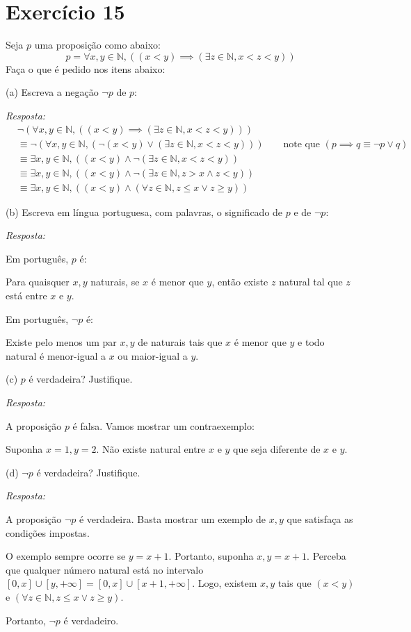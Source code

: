 \documentclass{article}
\begin{document}
\section*{Exercício 15}

Seja $p$ uma proposição como abaixo:
\[ p = \forall x,y \in \mathbb{N}, ((x<y) \implies (\exists z \in \mathbb{N}, x<z<y)) \]
Faça o que é pedido nos itens abaixo:

(a) Escreva a negação $\neg p$ de $p$:

\textit{Resposta: }
\begin{align*}
&\neg(\forall x,y \in \mathbb{N}, ((x<y) \implies (\exists z \in \mathbb{N}, x<z<y)))\\
&\equiv \neg(\forall x,y \in \mathbb{N}, (\neg(x<y) \lor (\exists z \in \mathbb{N}, x<z<y))) \qquad \mbox{note que }(p \implies q \equiv \neg p \lor q) \\
&\equiv \exists x,y \in \mathbb{N}, ((x<y) \land \neg (\exists z \in \mathbb{N}, x<z<y)) \\
&\equiv \exists x,y \in \mathbb{N}, ((x<y) \land \neg (\exists z \in \mathbb{N}, z>x \land z<y)) \\
&\equiv \exists x,y \in \mathbb{N}, ((x<y) \land (\forall z \in \mathbb{N}, z \leq x \lor z \geq y))
\end{align*}

(b) Escreva em língua portuguesa, com palavras, o significado de $p$ e de $\neg p$:

\textit{Resposta:}

Em português, $p$ é:

Para quaisquer $x,y$ naturais, se $x$ é menor que $y$, então existe $z$ natural tal que $z$ está entre $x$ e $y$.

Em português, $\neg p$ é:

Existe pelo menos um par $x,y$ de naturais tais que $x$ é menor que $y$ e todo natural é menor-igual a $x$ ou maior-igual a $y$.

(c) $p$ é verdadeira? Justifique.

\textit{Resposta:}

A proposição $p$ é falsa. Vamos mostrar um contraexemplo:

Suponha $x=1, y=2$.
Não existe natural entre $x$ e $y$ que seja diferente de $x$ e $y$.

(d) $\neg p$ é verdadeira? Justifique.

\textit{Resposta:}

A proposição $\neg p$ é verdadeira.
Basta mostrar um exemplo de $x,y$ que satisfaça as condições impostas.

O exemplo sempre ocorre se $y=x+1$.
Portanto, suponha $x,y = x+1$.
Perceba que qualquer número natural está no intervalo $[0,x] \cup [y,+\infty] = [0,x] \cup [x+1,+\infty]$.
Logo, existem $x,y$ tais que $(x < y)$ e $(\forall z \in \mathbb{N}, z \leq x \lor z \geq y)$.

Portanto, $\neg p$ é verdadeiro.
\end{document}
